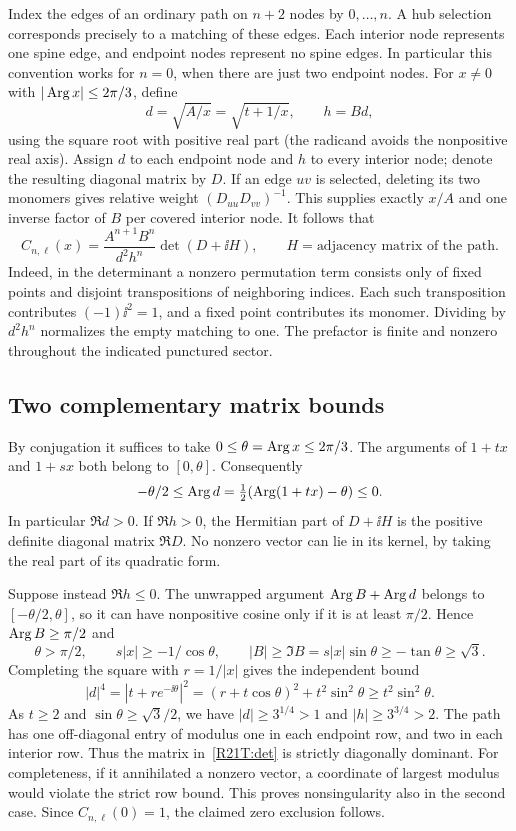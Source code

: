 \documentclass[11pt,a4paper]{article}
\begin{document}
Index the edges of an ordinary path on $n+2$ nodes by $0,\ldots,n$.
A hub selection corresponds precisely to a matching of these edges.
Each interior node represents one spine edge, and endpoint nodes represent
no spine edges. In particular this convention works for $n=0$, when
there are just two endpoint nodes. For $x\ne0$ with $|\operatorname{Arg} x|\le
2\pi/3$, define
\[
 d=\sqrt{A/x}=\sqrt{t+1/x},\qquad h=Bd,
\]
using the square root with positive real part (the radicand avoids the
nonpositive real axis). Assign $d$ to each endpoint node and $h$ to every
interior node; denote the resulting diagonal matrix by $D$. If an edge
$uv$ is selected, deleting its two monomers gives relative weight
$(D_{uu}D_{vv})^{-1}$. This supplies exactly $x/A$ and one inverse
factor of $B$ per covered interior node. It follows that
\begin{equation}\label{R21T:det}
 C_{n,\ell}(x)=\frac{A^{n+1}B^n}{d^2h^n}
 \det(D+\ii H),\qquad H=\text{adjacency matrix of the path}.
\end{equation}
Indeed, in the determinant a nonzero permutation term consists only of
fixed points and disjoint transpositions of neighboring indices. Each
such transposition contributes $(-1)\ii^2=1$, and a fixed point contributes
its monomer. Dividing by $d^2h^n$ normalizes the empty matching to one.
The prefactor is finite and nonzero throughout the indicated punctured
sector.

\subsection{Two complementary matrix bounds}
By conjugation it suffices to take $0\le\theta=\operatorname{Arg} x\le2\pi/3$.
The arguments of $1+tx$ and $1+sx$ both belong to $[0,\theta]$.
Consequently
\[
 -\theta/2\le\operatorname{Arg} d=\tfrac12(\operatorname{Arg}(1+tx)-\theta)\le0.
\]
In particular $\Re d>0$. If $\Re h>0$, the Hermitian part of
$D+\ii H$ is the positive definite diagonal matrix $\Re D$. No nonzero
vector can lie in its kernel, by taking the real part of its quadratic
form.

Suppose instead $\Re h\le0$. The unwrapped argument $\operatorname{Arg} B+\operatorname{Arg} d$
belongs to $[-\theta/2,\theta]$, so it can have nonpositive cosine
only if it is at least $\pi/2$. Hence $\operatorname{Arg} B\ge\pi/2$ and
\[
 \theta>\pi/2,\qquad s|x|\ge-1/\cos\theta,\qquad
 |B|\ge \Im B=s|x|\sin\theta\ge-\tan\theta\ge\sqrt3 .
\]
Completing the square with $r=1/|x|$ gives the independent bound
\[
 |d|^4=|t+r e^{-\ii\theta}|^2
       =(r+t\cos\theta)^2+t^2\sin^2\theta
       \ge t^2\sin^2\theta.
\]
As $t\ge2$ and $\sin\theta\ge\sqrt3/2$, we have
$|d|\ge3^{1/4}>1$ and $|h|\ge3^{3/4}>2$.
The path has one off-diagonal entry of modulus one in each endpoint
row, and two in each interior row. Thus the matrix in~\eqref{R21T:det} is
strictly diagonally dominant. For completeness, if it annihilated a
nonzero vector, a coordinate of largest modulus would violate the
strict row bound. This proves nonsingularity also in the second case.
Since $C_{n,\ell}(0)=1$, the claimed zero exclusion follows.
\end{document}
